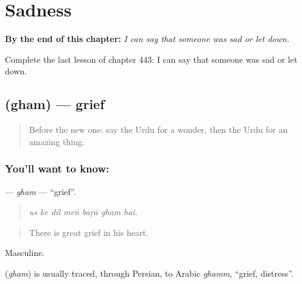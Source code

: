 
\chapter{Sadness}
\label{ch:ur-sadness}

\begin{chapteropening}
\textbf{By the end of this chapter:} \emph{I can say that someone was sad or let down.}

Complete the last lesson of chapter 443: I can say that someone was sad or let down.
\end{chapteropening}

\section[\texorpdfstring{\ur{غم} (gham)}{غم (gham)}]{ (gham) — grief}

\label{lesson:UR-C443-gham}



\begin{quote}
Before the new one: say the Urdu for a wonder, then the Urdu for an amazing thing.
\end{quote}

\subsection*{You'll want to know: }
\textbf{} — \emph{gham} — \textquotedblleft{}grief\textquotedblright{}.

\begin{quote}
      
\end{quote}

\begin{quote}
\emph{us ke dil meṅ baṛā gham hai.}
\end{quote}

\begin{quote}
There is great grief in his heart.
\end{quote}

Masculine.

\begin{cousinweb}
\textbf{} (\emph{gham}) is usually traced, through Persian, to Arabic \emph{ghamm}, \textquotedblleft{}grief, distress\textquotedblright{}.
\end{cousinweb}

